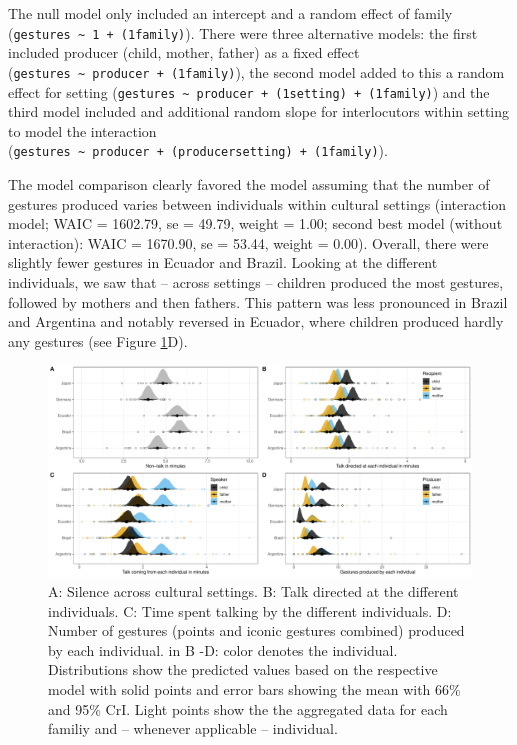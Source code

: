 \documentclass[
  man,floatsintext]{apa6}
\begin{document}
The null model only included an intercept and a random effect of family (\texttt{gestures\ \textasciitilde{}\ 1\ +\ (1\textbar{}family)}). There were three alternative models: the first included producer (child, mother, father) as a fixed effect (\texttt{gestures\ \textasciitilde{}\ producer\ +\ (1\textbar{}family)}), the second model added to this a random effect for setting (\texttt{gestures\ \textasciitilde{}\ producer\ +\ (1\textbar{}setting)\ +\ (1\textbar{}family)}) and the third model included and additional random slope for interlocutors within setting to model the interaction (\texttt{gestures\ \textasciitilde{}\ producer\ +\ (producer\textbar{}setting)\ +\ (1\textbar{}family)}).

The model comparison clearly favored the model assuming that the number of gestures produced varies between individuals within cultural settings (interaction model; WAIC = 1602.79, se = 49.79, weight = 1.00; second best model (without interaction): WAIC = 1670.90, se = 53.44, weight = 0.00). Overall, there were slightly fewer gestures in Ecuador and Brazil. Looking at the different individuals, we saw that -- across settings -- children produced the most gestures, followed by mothers and then fathers. This pattern was less pronounced in Brazil and Argentina and notably reversed in Ecuador, where children produced hardly any gestures (see Figure \ref{fig:fig1}D).

\begin{figure}
\includegraphics[width=1\linewidth]{../visuals/fig1} \caption{A: Silence across cultural settings. B: Talk directed at the different individuals. C: Time spent talking by the different individuals. D: Number of gestures (points and iconic gestures combined) produced by each individual. in B -D: color denotes the individual. Distributions show the predicted values based on the respective model with solid points and error bars showing the mean with 66\% and 95\% CrI. Light points show the the aggregated data for each familiy and -- whenever applicable -- individual.}\label{fig:fig1}
\end{figure}
\end{document}
